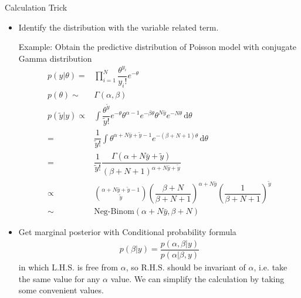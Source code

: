 \begin{point}
    Calculation Trick
\end{point}
\begin{itemize}[topsep=2pt,itemsep=0pt]
    \item Identify the distribution with the variable related term.
    
    Example: Obtain the predictive distribution of Poisson model with conjugate Gamma distribution
    \begin{align*}
        p(y|\theta )=&\prod_{i=1}^N\dfrac{ \theta ^{y_i} }{ y_i! }e^{-\theta }\\
        p(\theta )\sim &\Gamma (\alpha,\beta )\\ 
        p(\tilde{y}|y)\propto&\int \dfrac{ \theta ^{\tilde{y}} }{ \tilde{y}! }e^{-\theta } \theta ^{\alpha -1}e^{-\beta \theta }\theta ^{N\bar{y}}e^{-N\theta }  \,\mathrm{d}\theta \\
        = & \dfrac{ 1 }{ \tilde{y}! }\int\theta ^{\alpha +N\bar{y}+\tilde{y} -1}e^{-(\beta+N +1)\theta }  \,\mathrm{d}\theta\\
        =&\dfrac{ 1 }{ \tilde{y}! }\dfrac{ \Gamma (\alpha +N\bar{y}+\tilde{y}) }{ (\beta+N +1)^{\alpha +N\bar{y}+\tilde{y}} } \\
        \propto &\binom{\alpha +N\bar{y}+\tilde{y}-1 }{\tilde{y}}\left( \dfrac{ \beta+N  }{ \beta+N +1 }  \right)^{\alpha +N\bar{y}}\left( \dfrac{ 1 }{ \beta+N +1 } \right)^{\tilde{y}}\\
        \sim & \mathrm{Neg}\text{-}\mathrm{Binom}(\alpha +N\bar{y}, \beta+N )
    \end{align*}
    \item Get marginal posterior with Conditional probability formula
    \begin{align*}
        p(\beta |y)=\dfrac{ p(\alpha ,\beta |y) }{ p(\alpha |\beta ,y) }  
    \end{align*}
    in which $ \mathrm{ L.H.S. }  $ is free from $ \alpha  $, so $ \mathrm{ R.H.S. }  $ should be invariant of $ \alpha  $, i.e. take the same value for any $ \alpha  $ value. We can simplify the calculation by taking some convenient values.


\end{itemize}
